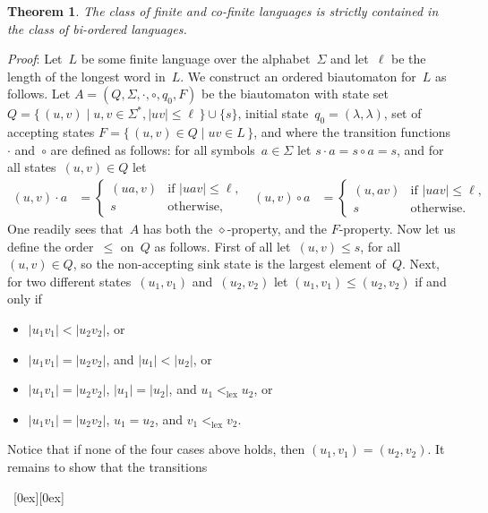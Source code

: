 \documentclass[submission]{eptcs}
\newcommand{\abs}[1]{\left\lvert{#1}\right\rvert}
\newcommand*{\qed}{\raisebox{0.5ex}[0ex][0ex]{\framebox[1ex][l]{}}}
\newtheorem{theorem}{Theorem}
\newenvironment{proof}{\par\noindent
  {\rmfamily\itshape\mdseries Proof\/}:\hspace{\labelsep}\ignorespaces}{\mbox{}\nolinebreak\hfill~{\qed}
  \medbreak
}
\begin{document}
\begin{theorem}\label{thm:finite-strictly-in-bi-ordered}
  The class of finite and co-finite languages is strictly contained in
  the class of bi-ordered languages.
\end{theorem}

\begin{proof}
  Let~$L$ be some finite language over the alphabet~$\Sigma$ and
  let~$\ell$ be the length of the longest word in~$L$.  We construct
  an ordered biautomaton for~$L$ as follows.  Let
  $A=(Q,\Sigma,\cdot,\circ,q_0,F)$ be the biautomaton with state set
$Q=\{\,(u,v)\mid u,v\in\Sigma^*, \abs{uv}\leq \ell\,\} \cup\{ s \}$,
initial state~$q_0 = (\lambda,\lambda)$, set of accepting states
$F=\{\,(u,v)\in Q\mid uv\in L\,\}$,
and where the transition functions~$\cdot$ and~$\circ$ are defined
  as follows: for all symbols~$a\in\Sigma$ let $s\cdot a = s\circ a =
  s$, and for all states~$(u,v)\in Q$ let
  \begin{align*}
    (u,v)\cdot a &=
    \begin{cases}
      (ua,v) &\text{if $\abs{uav}\leq\ell$,}\\
      s &\text{otherwise,}
    \end{cases}
    &    
    (u,v)\circ a &=
    \begin{cases}
      (u,av) &\text{if $\abs{uav}\leq\ell$,}\\
      s &\text{otherwise.}
    \end{cases}
  \end{align*}
  One readily sees that~$A$ has both the $\diamond$-property, and the
  $F$-property.  Now let us define the order~$\leq$ on~$Q$ as follows.
  First of all let~$(u,v)\leq s$, for all~$(u,v)\in Q$, so the
  non-accepting sink state is the largest element of~$Q$.  Next, for
  two different states~$(u_1,v_1)$ and~$(u_2,v_2)$ let $(u_1,v_1)\leq
  (u_2,v_2)$ if and only if
  \begin{itemize}
  \item $\abs{u_1v_1} < \abs{u_2v_2}$, or
  \item $\abs{u_1v_1} = \abs{u_2v_2}$, and $\abs{u_1} < \abs{u_2}$, or
  \item $\abs{u_1v_1} = \abs{u_2v_2}$, $\abs{u_1} = \abs{u_2}$, and
    $u_1 <_{\text{lex}} u_2$, or
  \item $\abs{u_1v_1} = \abs{u_2v_2}$, $u_1 = u_2$, and $v_1
    <_{\text{lex}} v_2$.
  \end{itemize}
  Notice that if none of the four cases above holds, then
  $(u_1,v_1)=(u_2,v_2)$.  It remains to show that the transitions

\end{proof}
\end{document}
